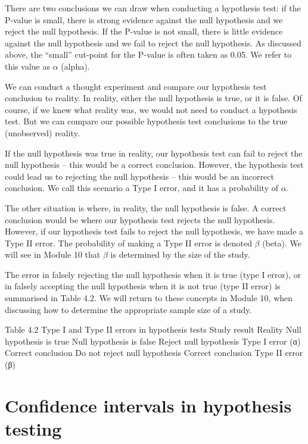 \documentclass[
]{memoir}
\begin{document}
There are two conclusions we can draw when conducting a hypothesis test: if the P-value is small, there is strong evidence against the null hypothesis and we reject the null hypothesis. If the P-value is not small, there is little evidence against the null hypothesis and we fail to reject the null hypothesis. As discussed above, the ``small'' cut-point for the P-value is often taken as 0.05. We refer to this value as \(\alpha\) (alpha).

We can conduct a thought experiment and compare our hypothesis test conclusion to reality. In reality, either the null hypothesis is true, or it is false. Of course, if we knew what reality was, we would not need to conduct a hypothesis test. But we can compare our possible hypothesis test conclusions to the true (unobserved) reality.

If the null hypothesis was true in reality, our hypothesis test can fail to reject the null hypothesis -- this would be a correct conclusion. However, the hypothesis test could lead us to rejecting the null hypothesis -- this would be an incorrect conclusion. We call this scenario a Type I error, and it has a probability of \(\alpha\).

The other situation is where, in reality, the null hypothesis is false. A correct conclusion would be where our hypothesis test rejects the null hypothesis. However, if our hypothesis test fails to reject the null hypothesis, we have made a Type II error. The probability of making a Type II error is denoted \(\beta\) (beta). We will see in Module 10 that \(\beta\) is determined by the size of the study.

The error in falsely rejecting the null hypothesis when it is true (type I error), or in falsely accepting the null hypothesis when it is not true (type II error) is summarised in Table 4.2. We will return to these concepts in Module 10, when discussing how to determine the appropriate sample size of a study.

Table 4.2 Type I and Type II errors in hypothesis tests
Study result Reality
Null hypothesis is true Null hypothesis is false
Reject null hypothesis Type I error (ɑ) Correct conclusion
Do not reject null hypothesis Correct conclusion Type II error (β)

\hypertarget{confidence-intervals-in-hypothesis-testing}{%
\section{Confidence intervals in hypothesis testing}\label{confidence-intervals-in-hypothesis-testing}}
\end{document}
